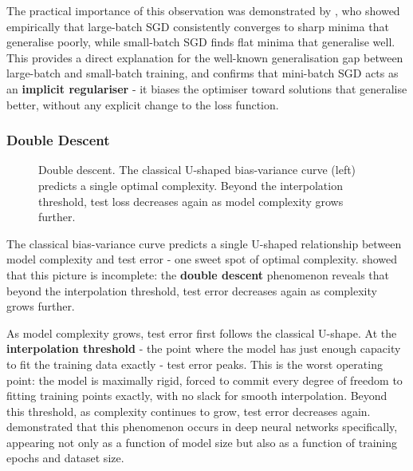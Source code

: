 The practical importance of this observation was demonstrated by \textcite{Keskar2017}, who showed empirically that large-batch SGD consistently converges to sharp minima that generalise poorly, while small-batch SGD finds flat minima that generalise well. This provides a direct explanation for the well-known generalisation gap between large-batch and small-batch training, and confirms that mini-batch SGD acts as an \textbf{implicit regulariser} - it biases the optimiser toward solutions that generalise better, without any explicit change to the loss function.

\subsubsection{Double Descent}

\begin{figure}
\centering
{}
\resizebox{0.40\textwidth}{!}{}
\caption{Double descent. The classical U-shaped bias-variance curve (left) predicts a single optimal complexity. Beyond the interpolation threshold, test loss decreases again as model complexity grows further.}
\label{fig:double_descent}
\end{figure}

The classical bias-variance curve predicts a single U-shaped relationship between model complexity and test error - one sweet spot of optimal complexity. \textcite{Belkin2019} showed that this picture is incomplete: the \textbf{double descent} phenomenon reveals that beyond the interpolation threshold, test error decreases again as complexity grows further.

As model complexity grows, test error first follows the classical U-shape. At the \textbf{interpolation threshold} - the point where the model has just enough capacity to fit the training data exactly - test error peaks. This is the worst operating point: the model is maximally rigid, forced to commit every degree of freedom to fitting training points exactly, with no slack for smooth interpolation. Beyond this threshold, as complexity continues to grow, test error decreases again. \textcite{Nakkiran2020} demonstrated that this phenomenon occurs in deep neural networks specifically, appearing not only as a function of model size but also as a function of training epochs and dataset size.

